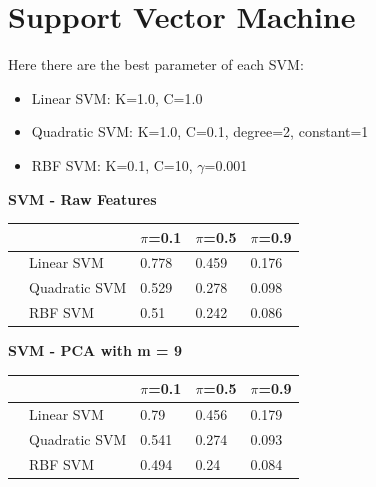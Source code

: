 \documentclass[english]{report}
\begin{document}
\newpage

\section{Support Vector Machine}
Here there are the best parameter of each SVM:
\begin{itemize}
    \item Linear SVM: K=1.0, C=1.0
    \item Quadratic SVM: K=1.0, C=0.1, degree=2, constant=1
    \item RBF SVM: K=0.1, C=10, $\gamma$=0.001
\end{itemize}

\textbf{SVM - Raw Features}

\begin{table}[H]
    \centering
    \begin{tabular}{lllll}
        \hline
                                & & $\pi$=0.1 & $\pi$=0.5 & $\pi$=0.9 \\\hline
                                
                                & Linear SVM        & 0.778 & 0.459 & 0.176 \\
                                & Quadratic SVM     & 0.529 & 0.278 & 0.098 \\
                                & RBF SVM           & 0.51  & 0.242 & 0.086\\ 
        \hline
    \end{tabular}
    \label{tab:SVM_Raw_eval}
\end{table}

\textbf{SVM - PCA with m = 9}

\begin{table}[H]
    \centering
    \begin{tabular}{lllll}
        \hline
                                & & $\pi$=0.1 & $\pi$=0.5 & $\pi$=0.9 \\\hline
                                                        
                                & Linear SVM        & 0.79  & 0.456 & 0.179 \\
                                & Quadratic SVM     & 0.541 & 0.274 & 0.093 \\
                                & RBF SVM           & 0.494 & 0.24  & 0.084\\  
        \hline
    \end{tabular}
    \label{tab:SVM_PCA9_eval}
\end{table}
\end{document}
